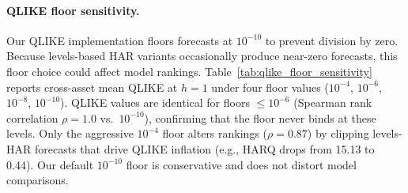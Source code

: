 \documentclass[12pt]{article}
\begin{document}


\paragraph{QLIKE floor sensitivity.}
Our QLIKE implementation floors forecasts at $10^{-10}$ to prevent division by zero. Because levels-based HAR variants occasionally produce near-zero forecasts, this floor choice could affect model rankings. Table~\ref{tab:qlike_floor_sensitivity} reports cross-asset mean QLIKE at $h = 1$ under four floor values ($10^{-4}$, $10^{-6}$, $10^{-8}$, $10^{-10}$). QLIKE values are identical for floors $\leq 10^{-6}$ (Spearman rank correlation $\rho = 1.0$ vs.\ $10^{-10}$), confirming that the floor never binds at these levels. Only the aggressive $10^{-4}$ floor alters rankings ($\rho = 0.87$) by clipping levels-HAR forecasts that drive QLIKE inflation (e.g., HARQ drops from 15.13 to 0.44). Our default $10^{-10}$ floor is conservative and does not distort model comparisons.


\end{document}

